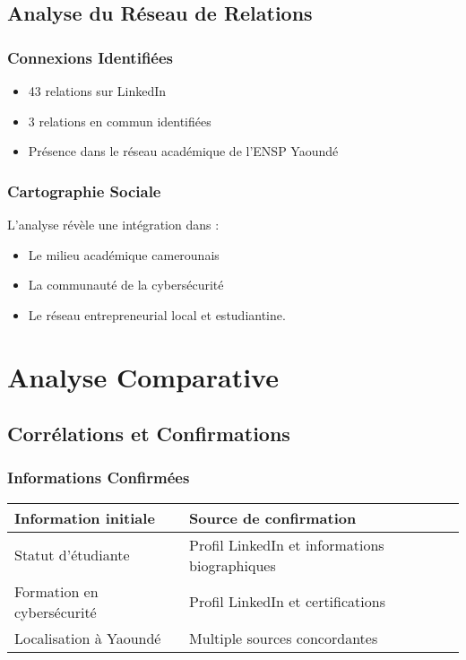 \documentclass[12pt, a4paper]{article}
\begin{document}
\subsection{Analyse du Réseau de Relations}
\subsubsection{Connexions Identifiées}
\begin{itemize}
    \item 43 relations sur LinkedIn
    \item 3 relations en commun identifiées
    \item Présence dans le réseau académique de l'ENSP Yaoundé
\end{itemize}

\subsubsection{Cartographie Sociale}
L'analyse révèle une intégration dans :
\begin{itemize}
    \item Le milieu académique camerounais
    \item La communauté de la cybersécurité
    \item Le réseau entrepreneurial local et estudiantine.
\end{itemize}

\section{Analyse Comparative}
\subsection{Corrélations et Confirmations}

\subsubsection{Informations Confirmées}
\begin{table}[H]
\centering
\begin{tabular}{|p{6cm}|p{6cm}|}
\hline
\textbf{Information initiale} & \textbf{Source de confirmation} \\
\hline
Statut d'étudiante & Profil LinkedIn et informations biographiques \\
\hline
Formation en cybersécurité & Profil LinkedIn et certifications \\
\hline
Localisation à Yaoundé & Multiple sources concordantes \\
\hline
\end{tabular}
\end{table}
\end{document}
